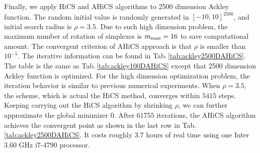 \documentclass[final,1p,times]{elsarticle}
\begin{document}
Finally, we apply HiCS and AHiCS algorithms to 2500 dimension Ackley function.
The random initial value is randomly generated in
$[-10,10]^{2500}$, and initial search radius is $\rho=3.5$. 
Due to such high dimension problem, the maximum number of
rotation of simplexes is $m_{\rm max}=16$ to save computational amount.
The convergent criterion of AHiCS approach is that $\rho$ is 
smaller than $10^{-5}$.
The iterative information can be found in
Tab.\,\ref{tab:ackley2500DAHiCS}.
The table is the same as Tab.\,\ref{tab:ackley100DAHiCS} except
that 2500 dimension Ackley function is optimized. 
For the high dimension optimization problem, the iteration
behavior is similar to previous numerical experiments. 
When $\rho=3.5$, the scheme, which is actual the HiCS method,
converges within $5415$ steps. Keeping carrying out the HiCS algorithm
by shrinking $\rho$, we can further approximate the global
minimizer $0$. After $61755$ iterations, the AHiCS algorithm 
achieves the convergent point as shown in the last row in
Tab.\,\ref{tab:ackley2500DAHiCS}. It costs roughly $3.7$ hours 
of real time using one Inter 3.60 GHz i7-4790 processor.
\end{document}
